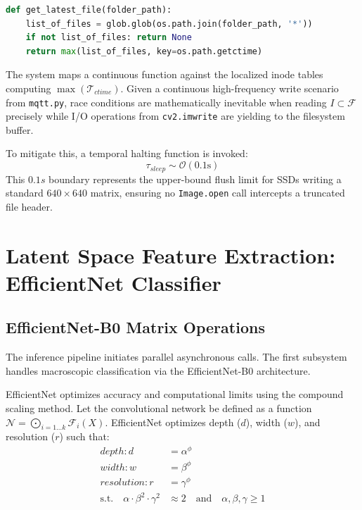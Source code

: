 \documentclass[11pt, letterpaper, oneside, openany]{book}
\begin{document}
\begin{lstlisting}[language=Python, caption=Timestamp Deterministic Polling]
def get_latest_file(folder_path):
    list_of_files = glob.glob(os.path.join(folder_path, '*'))
    if not list_of_files: return None
    return max(list_of_files, key=os.path.getctime)
\end{lstlisting}

The system maps a continuous function against the localized inode tables computing $\max(\mathcal{T}_{ctime})$. Given a continuous high-frequency write scenario from \texttt{mqtt.py}, race conditions are mathematically inevitable when reading $I \subset \mathcal{F}$ precisely while I/O operations from \texttt{cv2.imwrite} are yielding to the filesystem buffer.

To mitigate this, a temporal halting function is invoked:
\begin{equation}
    \tau_{sleep} \sim \mathcal{O}(0.1 \text{s})
\end{equation}
This $0.1s$ boundary represents the upper-bound flush limit for SSDs writing a standard $640 \times 640$ matrix, ensuring no \texttt{Image.open} call intercepts a truncated file header.

\chapter{Latent Space Feature Extraction: EfficientNet Classifier}

\section{EfficientNet-B0 Matrix Operations}
The inference pipeline initiates parallel asynchronous calls. The first subsystem handles macroscopic classification via the EfficientNet-B0 architecture.

EfficientNet optimizes accuracy and computational limits using the compound scaling method. Let the convolutional network be defined as a function $\mathcal{N} = \bigodot_{i=1 \dots k} \mathcal{F}_i(X)$. EfficientNet optimizes depth ($d$), width ($w$), and resolution ($r$) such that:
\begin{align}
    depth: d &= \alpha^\phi \\
    width: w &= \beta^\phi \\
    resolution: r &= \gamma^\phi \\
    \text{s.t.} \quad \alpha \cdot \beta^2 \cdot \gamma^2 &\approx 2 \quad \text{and} \quad \alpha, \beta, \gamma \geq 1
\end{align}
\end{document}
